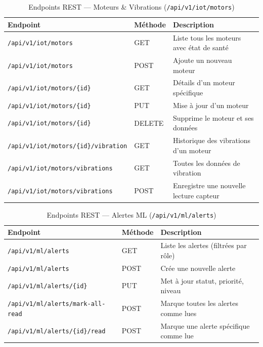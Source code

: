 \documentclass[12pt, a4paper, oneside]{report}
\begin{document}
\begin{table}[H]
  \centering
  \scriptsize
  \begin{tabularx}{\textwidth}{L{5.5cm} C{1.8cm} L{5cm}}
    \toprule
    \textbf{Endpoint} & \textbf{Méthode} & \textbf{Description} \\
    \midrule
           \texttt{/api/v1/iot/motors}                    & GET    & Liste tous les moteurs avec état de santé \\
    \texttt{/api/v1/iot/motors}                    & POST   & Ajoute un nouveau moteur \\
           \texttt{/api/v1/iot/motors/\{id\}}             & GET    & Détails d'un moteur spécifique \\
    \texttt{/api/v1/iot/motors/\{id\}}             & PUT    & Mise à jour d'un moteur \\
           \texttt{/api/v1/iot/motors/\{id\}}             & DELETE & Supprime le moteur et ses données \\
    \texttt{/api/v1/iot/motors/\{id\}/vibration}   & GET    & Historique des vibrations d'un moteur \\
           \texttt{/api/v1/iot/motors/vibrations}         & GET    & Toutes les données de vibration \\
    \texttt{/api/v1/iot/motors/vibrations}         & POST   & Enregistre une nouvelle lecture capteur \\
    \bottomrule
  \end{tabularx}
  \caption{Endpoints REST --- Moteurs \& Vibrations (\texttt{/api/v1/iot/motors})}
\end{table}

\begin{table}[H]
  \centering
  \scriptsize
  \begin{tabularx}{\textwidth}{L{5.5cm} C{1.8cm} L{5cm}}
    \toprule
    \textbf{Endpoint} & \textbf{Méthode} & \textbf{Description} \\
    \midrule
           \texttt{/api/v1/ml/alerts}               & GET  & Liste les alertes (filtrées par rôle) \\
    \texttt{/api/v1/ml/alerts}               & POST & Crée une nouvelle alerte \\
           \texttt{/api/v1/ml/alerts/\{id\}}        & PUT  & Met à jour statut, priorité, niveau \\
    \texttt{/api/v1/ml/alerts/mark-all-read} & POST & Marque toutes les alertes comme lues \\
           \texttt{/api/v1/ml/alerts/\{id\}/read}   & POST & Marque une alerte spécifique comme lue \\
    \bottomrule
  \end{tabularx}
  \caption{Endpoints REST --- Alertes ML (\texttt{/api/v1/ml/alerts})}
\end{table}
\end{document}
